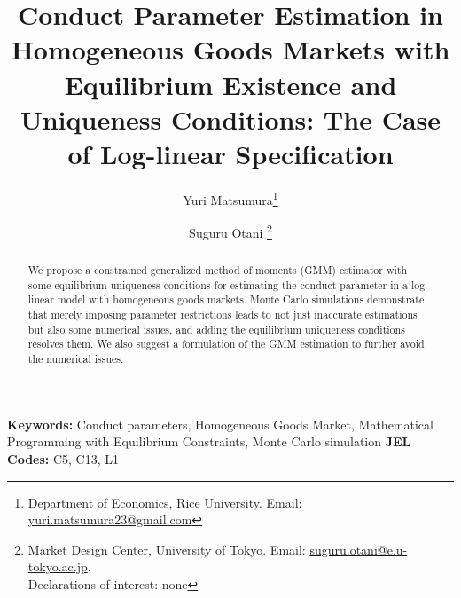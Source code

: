 \documentclass[11pt, a4paper]{article}
\title{Conduct Parameter Estimation in Homogeneous Goods Markets with Equilibrium Existence and Uniqueness Conditions: The Case of Log-linear Specification}
\author{Yuri Matsumura\thanks{Department of Economics, Rice University. Email: \href{mailto:}{yuri.matsumura23@gmail.com}} \and Suguru Otani \thanks{Market Design Center, University of Tokyo. Email: \href{mailto:}{suguru.otani@e.u-tokyo.ac.jp}.
\\Declarations of interest: none %
}}
\theoremstyle{remark}
\begin{document}
\maketitle
\begin{abstract}
    We propose a constrained generalized method of moments (GMM) estimator with some equilibrium uniqueness conditions for estimating the conduct parameter in a log-linear model with homogeneous goods markets.
    Monte Carlo simulations demonstrate that merely imposing parameter restrictions leads to not just inaccurate estimations but also some numerical issues, and adding the equilibrium uniqueness conditions resolves them.
    We also suggest a formulation of the GMM estimation to further avoid the numerical issues.
\end{abstract}

\noindent\textbf{Keywords:} Conduct parameters, Homogeneous Goods Market, Mathematical Programming with Equilibrium Constraints, Monte Carlo simulation
\vspace{0in}
\newline
\noindent\textbf{JEL Codes:} C5, C13, L1

\bigskip

\newpage
\end{document}

